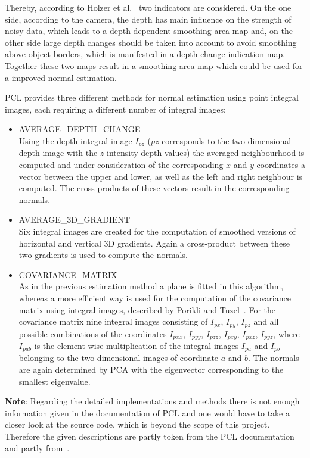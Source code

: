 \documentclass[paper=a4,11pt,bibliography=totoc]{scrartcl}
\begin{document}
\begin{itemize}
Thereby, according to Holzer et al.~\cite{integral} two indicators are considered. On the one side, according to the camera, the depth has main influence on the strength of noisy data, which leads to a depth-dependent smoothing area map and, on the other side large depth changes should be taken into account to avoid smoothing above object borders, which is manifested in a depth change indication map. Together these two maps result in a smoothing area map which could be used for a improved normal estimation.

PCL provides three different methods for normal estimation using point integral images, each requiring a different number of integral images:
%
\begin{itemize}
\item \textsf{AVERAGE\_DEPTH\_CHANGE}\\
Using the depth integral image $I_{pz}$ ($pz$ corresponds to the two dimensional depth image with the $z$-intensity depth values) the averaged neighbourhood is computed and under consideration of the corresponding $x$ and $y$ coordinates a vector between the upper and lower, as well as the left and right neighbour is computed. The cross-products of these vectors result in the corresponding normals.
\item \textsf{AVERAGE\_3D\_GRADIENT}\\
Six integral images are created for the computation of smoothed versions of horizontal and vertical 3D gradients. Again a cross-product between these two gradients is used to compute the normals.
\item \textsf{COVARIANCE\_MATRIX}\\
As in the previous estimation method  a plane is fitted in this algorithm, whereas a more efficient way is used for the computation of the covariance matrix using integral images, described by Porikli and Tuzel~\cite{tuzel}. For the covariance matrix nine integral images consisting of $I_{px}$, $I_{py}$, $I_{pz}$ and all possible combinations of the coordinates $I_{pxx}$, $I_{pyy}$, $I_{pzz}$, $I_{pxy}$, $I_{pxz}$, $I_{pyz}$, where $I_{pab}$ is the element wise multiplication of the integral images $I_{pa}$ and $I_{pb}$ belonging to the two dimensional images of coordinate $a$ and $b$. The normals are again determined by PCA with the eigenvector corresponding to the smallest eigenvalue.
\end{itemize}
%
\textbf{Note}: Regarding the detailed implementations and methods there is not enough information given in the documentation of PCL and one would have to take a closer look at the source code, which is beyond the scope of this project. Therefore the given descriptions are partly token from the PCL documentation and partly from~\cite{integral}.

\end{itemize}
\end{document}
